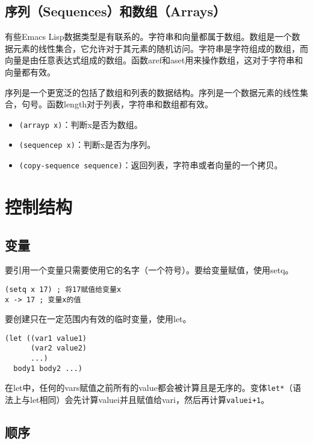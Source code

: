 \subsection{序列（Sequences）和数组（Arrays）}
\label{section:B-Sequences-and-Arrays}

有些Emacs Lisp数据类型是有联系的。字符串和向量都属于数组。数组是一个数据元素的线性集合，它允许对于其元素的随机访问。字符串是字符组成的数组，而向量是由任意表达式组成的数组。函数aref和aset用来操作数组，这对于字符串和向量都有效。

序列是一个更宽泛的包括了数组和列表的数据结构。序列是一个数据元素的线性集合，句号。函数length对于列表，字符串和数组都有效。

\begin{itemize}
  \item \texttt{(arrayp x)}：判断x是否为数组。
  \item \texttt{(sequencep x)}：判断x是否为序列。
  \item \texttt{(copy-sequence sequence)}：返回列表，字符串或者向量的一个拷贝。
\end{itemize}

\section{控制结构}
\label{section:B-Control-Structures}

\subsection{变量}
\label{section:B-Variables}

要引用一个变量只需要使用它的名字（一个符号）。要给变量赋值，使用setq。
\begin{verbatim}
(setq x 17) ; 将17赋值给变量x
x -> 17 ; 变量x的值
\end{verbatim}

要创建只在一定范围内有效的临时变量，使用let。
\begin{verbatim}
(let ((var1 value1)
      (var2 value2)
      ...)
  body1 body2 ...)
\end{verbatim}

在let中，任何的vars赋值之前所有的value都会被计算且是无序的。变体\texttt{let*}（语法上与let相同）会先计算valuei并且赋值给vari，然后再计算\texttt{valuei+1}。

\subsection{顺序}
\label{section:B-Sequencing}


